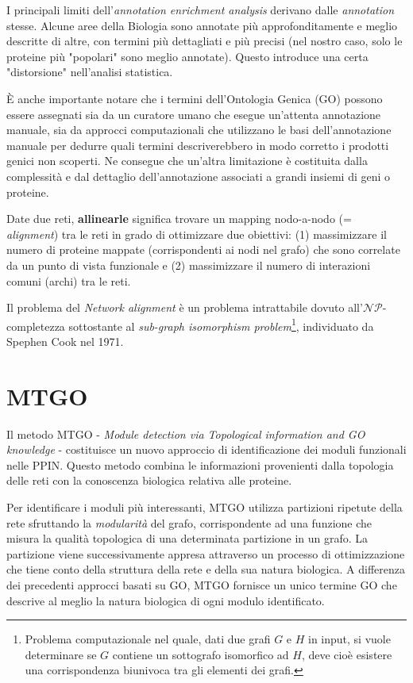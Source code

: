 \documentclass[11pt]{article}
\begin{document}
I principali limiti dell'\textit{annotation enrichment analysis} derivano dalle \textit{annotation} stesse. Alcune aree della Biologia sono annotate più approfonditamente e meglio descritte di altre, con termini più dettagliati e più precisi (nel nostro caso, solo le proteine più "popolari" sono meglio annotate). Questo introduce una certa "distorsione" nell'analisi statistica.

È anche importante notare che i termini dell'Ontologia Genica (GO) possono essere assegnati sia da un curatore umano che esegue un'attenta annotazione manuale, sia da approcci computazionali che utilizzano le basi dell'annotazione manuale per dedurre quali termini descriverebbero in modo corretto i prodotti genici non scoperti. Ne consegue che un'altra limitazione è costituita dalla complessità e dal dettaglio dell'annotazione associati a grandi insiemi di geni o proteine. 
\pagebreak


Date due reti, \textbf{allinearle} significa trovare un mapping nodo-a-nodo (= \textit{alignment}) tra le reti in grado di ottimizzare due obiettivi: (1) massimizzare il numero di proteine mappate (corrispondenti ai nodi nel grafo) che sono correlate da un punto di vista funzionale e (2) massimizzare il numero di interazioni comuni (archi) tra le reti.

Il problema del \textit{Network alignment} è un problema intrattabile dovuto all'$\mathcal{NP}$-completezza sottostante al \textit{sub-graph isomorphism problem}\footnote{Problema computazionale nel quale, dati due grafi $G$ e $H$ in input, si vuole determinare se $G$ contiene un sottografo isomorfico ad $H$, deve cioè esistere una corrispondenza biunivoca tra gli elementi dei grafi.}, individuato da Spephen Cook nel 1971.

\section{MTGO}
Il metodo MTGO - \textit{Module detection via Topological information and GO knowledge} - costituisce un nuovo approccio di identificazione dei moduli funzionali nelle PPIN. Questo metodo combina le informazioni provenienti dalla topologia delle reti con la conoscenza biologica relativa alle proteine.
 
Per identificare i moduli più interessanti, MTGO utilizza partizioni ripetute della rete sfruttando la \textit{modularità} del grafo, corrispondente ad una funzione che misura la qualità topologica di una determinata partizione in un grafo. La partizione viene successivamente appresa attraverso un processo di ottimizzazione che tiene conto della struttura della rete e della sua natura biologica. A differenza dei precedenti approcci basati su GO, MTGO fornisce un unico termine GO che descrive al meglio la natura biologica di ogni modulo identificato.
\end{document}
